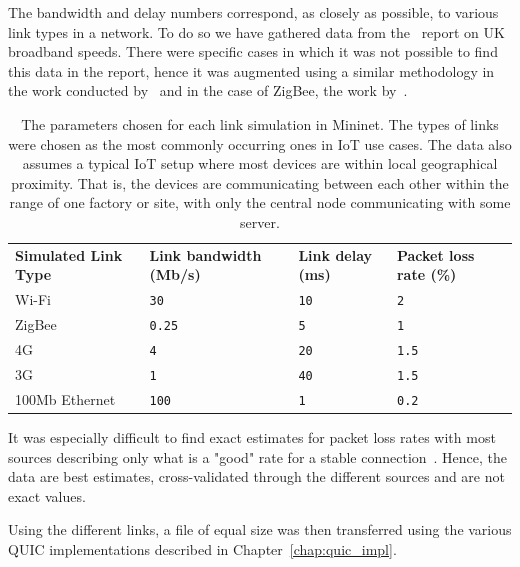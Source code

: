 The bandwidth and delay numbers correspond, as closely as possible, to various link types in a network.
To do so we have gathered data from the~\cite{ofcom_uk_2021} report on UK broadband speeds.
There were specific cases in which it was not possible to find this data in the report, hence it was augmented using a similar methodology in the work conducted by~\cite{previdi_is-is_2019} and in the case of ZigBee, the work by~\citet{alena_fault_2011}.

\begin{table}[ht]
    \caption{The parameters chosen for each link simulation in Mininet. The types of links were chosen as the most commonly occurring ones in IoT use cases. The data also assumes a typical IoT setup where most devices are within local geographical proximity. That is, the devices are communicating between each other within the range of one factory or site, with only the central node communicating with some server.}\label{tab:links}
    \begin{tabular}{@{}llll@{}}
        \toprule
        \textbf{Simulated Link Type} & \textbf{Link bandwidth (Mb/s)} & \textbf{Link delay (ms)} & \textbf{Packet loss rate (\%)} \\
        Wi-Fi                        & \texttt{30}                    & \texttt{10}              & \texttt{2}                     \\
        ZigBee                       & \texttt{0.25}                  & \texttt{5}               & \texttt{1}                     \\
        4G                           & \texttt{4}                     & \texttt{20}              & \texttt{1.5}                   \\
        3G                           & \texttt{1}                     & \texttt{40}              & \texttt{1.5}                   \\
        100Mb Ethernet               & \texttt{100}                   & \texttt{1}               & \texttt{0.2}                   \\
        \bottomrule
    \end{tabular}
\end{table}

It was especially difficult to find exact estimates for packet loss rates with most sources describing only what is a "good" rate for a stable connection~\citep{sdu_ictp-sdu_2013}.
Hence, the data are best estimates, cross-validated through the different sources and are not exact values.

Using the different links, a file of equal size was then transferred using the various QUIC implementations described in Chapter~\ref{chap:quic_impl}.